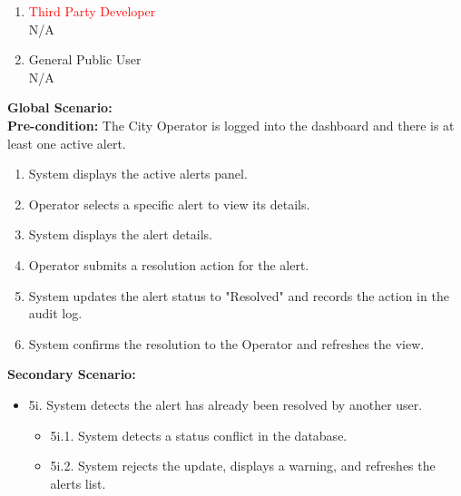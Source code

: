 {\begin{enumerate}[{\bf BE1.}]
\begin{enumerate}[{\bf VP1.}]
            {\bf Secondary Scenario:}
            \begin{itemize}
                \item[] {6i.} System detects the alert has already been resolved by another Operator.
                \begin{itemize}
                    \item[] {6i.1.} System detects a status conflict in the database.
                    \item[] {6i.2.} System prevents the state change, displays a warning that the alert was already resolved, and refreshes the active alerts list.
                \end{itemize}
            \end{itemize}
        \item \textcolor{red}{Third Party Developer} \\ N/A
        \item General Public User \\ N/A
    \end{enumerate}
    {\bf Global Scenario:} \\
    {\bf Pre-condition:} The City Operator is logged into the dashboard and there is at least one active alert.
        \begin{enumerate}[1. ]
            \item System displays the active alerts panel.
            \item Operator selects a specific alert to view its details.
            \item System displays the alert details.
            \item Operator submits a resolution action for the alert.
            \item System updates the alert status to "Resolved" and records the action in the audit log.
            \item System confirms the resolution to the Operator and refreshes the view.
        \end{enumerate}

    {\bf Secondary Scenario:}
        \begin{itemize}
            \item[] {5i.} System detects the alert has already been resolved by another user.
            \begin{itemize}
                \item[] {5i.1.} System detects a status conflict in the database.
                \item[] {5i.2.} System rejects the update, displays a warning, and refreshes the alerts list.
            \end{itemize}
        \end{itemize}


\end{enumerate}}
